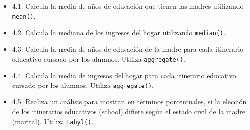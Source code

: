 \documentclass[
]{article}
\providecommand{\tightlist}{%
  \setlength{\itemsep}{0pt}\setlength{\parskip}{0pt}}
\begin{document}
\begin{itemize}
\tightlist
\item
  4.1. Calcula la media de años de educación que tienen las madres
  utilizando \texttt{mean()}.
\item
  4.2. Calcula la mediana de los ingresos del hogar utilizando
  \texttt{median()}.
\item
  4.3. Calcula la media de años de educación de la madre para cada
  itinerario educativo cursado por los alumnos. Utiliza
  \texttt{aggregate()}.
\item
  4.4. Calcula la media de ingresos del hogar para cada itinerario
  educativo cursado por los alumnos. Utiliza \texttt{aggregate()}.
\item
  4.5. Realiza un análisis para mostrar, en términos porcentuales, si la
  elección de los itinerarios educativos (school) difiere según el
  estado civil de la madre (marital). Utiliza \texttt{tabyl()}.
\end{itemize}
\end{document}
